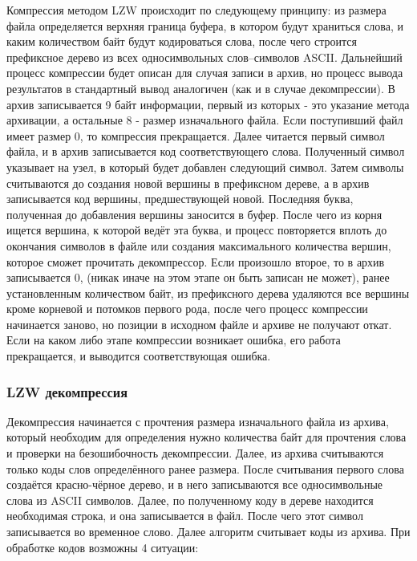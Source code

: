 \documentclass[12pt]{article}
\begin{document}
Компрессия методом LZW происходит по следующему принципу: из размера файла определяется верхняя граница буфера, в котором будут храниться слова, и каким количеством байт будут кодироваться слова, после чего строится префиксное дерево из всех односимвольных слов--символов ASCII. Дальнейший процесс компрессии будет описан для случая записи в архив, но процесс вывода результатов в стандартный вывод аналогичен (как и в случае декомпрессии). В архив записывается 9 байт информации, первый из которых - это указание метода архивации, а остальные 8 - размер изначального файла. Если поступивший файл имеет размер $0$, то компрессия прекращается. Далее читается первый символ файла, и в архив записывается код соответствующего слова. Полученный символ указывает на узел, в который будет добавлен следующий символ. Затем символы считываются до создания новой вершины в префиксном дереве, а в архив записывается код вершины, предшествующей новой. Последняя буква, полученная до добавления вершины заносится в буфер. После чего из корня ищется вершина, к которой ведёт эта буква, и процесс повторяется вплоть до окончания символов в файле или создания максимального количества вершин, которое сможет прочитать декомпрессор. Если произошло второе, то в архив записывается $0$, (никак иначе на этом этапе он быть записан не может), ранее установленным количеством байт, из префиксного дерева удаляются все вершины кроме корневой и потомков первого рода, после чего процесс компрессии начинается заново, но позиции в исходном файле и архиве не получают откат. Если на каком либо этапе компрессии возникает ошибка, его работа прекращается, и выводится соответствующая ошибка.

\subsubsection*{LZW декомпрессия}

Декомпрессия начинается с прочтения размера изначального файла из архива, который необходим для определения нужно количества байт для прочтения слова и проверки на безошибочность декомпрессии. Далее, из архива считываются только коды слов определённого ранее размера. После считывания первого слова создаётся красно-чёрное дерево, и в него записываются все односимвольные слова из ASCII символов. Далее, по полученному коду в дереве находится необходимая строка, и она записывается в файл. После чего этот символ записывается во временное слово. Далее алгоритм считывает коды из архива. При обработке кодов возможны 4 ситуации:
\end{document}
